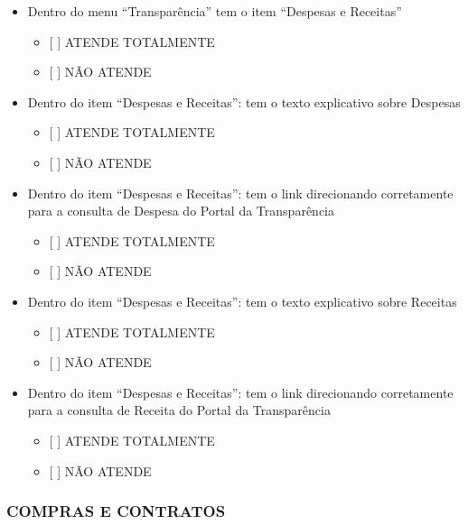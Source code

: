 \documentclass[]{book}
\providecommand{\tightlist}{%
  \setlength{\itemsep}{0pt}\setlength{\parskip}{0pt}}
\begin{document}
\begin{itemize}
\tightlist
\item
  Dentro do menu ``Transparência'' tem o item ``Despesas e Receitas''

  \begin{itemize}
  \tightlist
  \item
    {[} {]} ATENDE TOTALMENTE
  \item
    {[} {]} NÃO ATENDE
  \end{itemize}
\item
  Dentro do item ``Despesas e Receitas'': tem o texto explicativo sobre Despesas

  \begin{itemize}
  \tightlist
  \item
    {[} {]} ATENDE TOTALMENTE
  \item
    {[} {]} NÃO ATENDE
  \end{itemize}
\item
  Dentro do item ``Despesas e Receitas'': tem o link direcionando corretamente para a consulta de Despesa do Portal da Transparência

  \begin{itemize}
  \tightlist
  \item
    {[} {]} ATENDE TOTALMENTE
  \item
    {[} {]} NÃO ATENDE
  \end{itemize}
\item
  Dentro do item ``Despesas e Receitas'': tem o texto explicativo sobre Receitas

  \begin{itemize}
  \tightlist
  \item
    {[} {]} ATENDE TOTALMENTE
  \item
    {[} {]} NÃO ATENDE
  \end{itemize}
\item
  Dentro do item ``Despesas e Receitas'': tem o link direcionando corretamente para a consulta de Receita do Portal da Transparência

  \begin{itemize}
  \tightlist
  \item
    {[} {]} ATENDE TOTALMENTE
  \item
    {[} {]} NÃO ATENDE
  \end{itemize}
\end{itemize}

\hypertarget{compras-e-contratos-1}{%
\subsubsection*{COMPRAS E CONTRATOS}\label{compras-e-contratos-1}}
\end{document}
